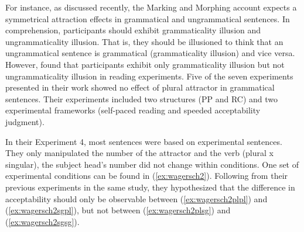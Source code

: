 For instance, as discussed recently, the Marking and Morphing account expects a symmetrical attraction effects in grammatical and ungrammatical sentences. In comprehension, participants should exhibit grammaticality illusion and ungrammaticality illusion. That is, they should be illusioned to think that an ungrammatical sentence is grammatical (grammaticality illusion) and vice versa. However,  found that participants exhibit only grammaticality illusion but not ungrammaticality illusion in reading experiments. Five of the seven experiments presented in their work showed no effect of plural attractor in grammatical sentences. Their experiments included two structures (PP and RC) and two experimental frameworks (self-paced reading and speeded acceptability judgment). 

In their Experiment 4, most sentences were based on \cites{PearlmutterGarnseyBock:1999} experimental sentences. They only manipulated the number of the attractor and the verb (plural x singular), the subject head's number did not change within conditions. One set of experimental conditions can be found in (\ref{ex:wagersch2}). Following from their previous experiments in the same study, they hypothesized that the difference in acceptability should only be observable between (\ref{ex:wagersch2plpl}) and (\ref{ex:wagersch2sgpl}), but not between (\ref{ex:wagersch2plsg}) and (\ref{ex:wagersch2sgsg}).

\ea \label{ex:wagersch2}
  \z
\z


